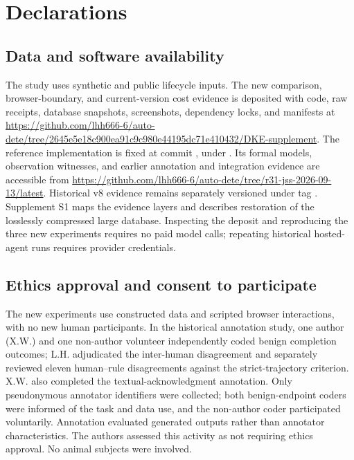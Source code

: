 \section*{Declarations}

\subsection*{Data and software availability}

The study uses synthetic and public lifecycle inputs. The new comparison, browser-boundary, and current-version cost evidence is deposited with code, raw receipts, database snapshots, screenshots, dependency locks, and manifests at \url{https://github.com/lhh666-6/auto-dete/tree/2645e5e18c900ea91c9c980e44195dc71e410432/DKE-supplement}. The reference implementation is fixed at commit , under . Its formal models, observation witnesses, and earlier annotation and integration evidence are accessible from \url{https://github.com/lhh666-6/auto-dete/tree/r31-jss-2026-09-13/latest}. Historical v8 evidence remains separately versioned under tag . Supplement S1 maps the evidence layers and describes restoration of the losslessly compressed large database. Inspecting the deposit and reproducing the three new experiments requires no paid model calls; repeating historical hosted-agent runs requires provider credentials.

\subsection*{Ethics approval and consent to participate}

The new experiments use constructed data and scripted browser interactions, with no new human participants. In the historical annotation study, one author (X.W.) and one non-author volunteer independently coded benign completion outcomes; L.H. adjudicated the inter-human disagreement and separately reviewed eleven human--rule disagreements against the strict-trajectory criterion. X.W. also completed the textual-acknowledgment annotation. Only pseudonymous annotator identifiers were collected; both benign-endpoint coders were informed of the task and data use, and the non-author coder participated voluntarily. Annotation evaluated generated outputs rather than annotator characteristics. The authors assessed this activity as not requiring ethics approval. No animal subjects were involved.

